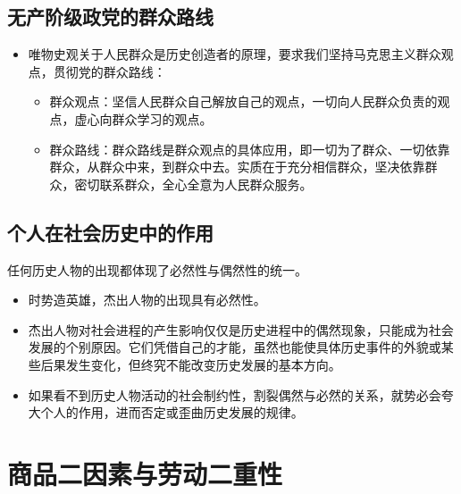\documentclass[
]{article}
\begin{document}
\hypertarget{ux65e0ux4ea7ux9636ux7ea7ux653fux515aux7684ux7fa4ux4f17ux8defux7ebf}{%
\subsection{无产阶级政党的群众路线}\label{ux65e0ux4ea7ux9636ux7ea7ux653fux515aux7684ux7fa4ux4f17ux8defux7ebf}}

\begin{itemize}
\item
  唯物史观关于人民群众是历史创造者的原理，要求我们坚持马克思主义群众观点，贯彻党的群众路线：

  \begin{itemize}
  \item
    群众观点：坚信人民群众自己解放自己的观点，一切向人民群众负责的观点，虚心向群众学习的观点。
  \item
    群众路线：群众路线是群众观点的具体应用，即一切为了群众、一切依靠群众，从群众中来，到群众中去。实质在于充分相信群众，坚决依靠群众，密切联系群众，全心全意为人民群众服务。
  \end{itemize}
\end{itemize}

\hypertarget{ux4e2aux4ebaux5728ux793eux4f1aux5386ux53f2ux4e2dux7684ux4f5cux7528}{%
\subsection{个人在社会历史中的作用}\label{ux4e2aux4ebaux5728ux793eux4f1aux5386ux53f2ux4e2dux7684ux4f5cux7528}}

任何历史人物的出现都体现了必然性与偶然性的统一。

\begin{itemize}
\item
  时势造英雄，杰出人物的出现具有必然性。
\item
  杰出人物对社会进程的产生影响仅仅是历史进程中的偶然现象，只能成为社会发展的个别原因。它们凭借自己的才能，虽然也能使具体历史事件的外貌或某些后果发生变化，但终究不能改变历史发展的基本方向。
\item
  如果看不到历史人物活动的社会制约性，割裂偶然与必然的关系，就势必会夸大个人的作用，进而否定或歪曲历史发展的规律。
\end{itemize}

\hypertarget{ux5546ux54c1ux4e8cux56e0ux7d20ux4e0eux52b3ux52a8ux4e8cux91cdux6027}{%
\section{商品二因素与劳动二重性}\label{ux5546ux54c1ux4e8cux56e0ux7d20ux4e0eux52b3ux52a8ux4e8cux91cdux6027}}
\end{document}
